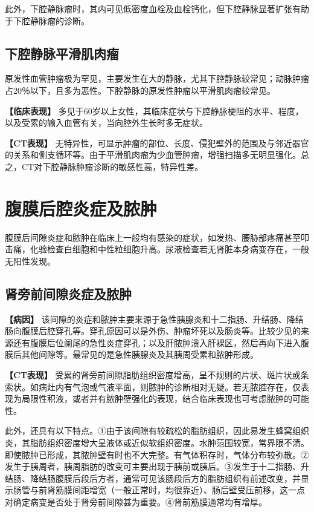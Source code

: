此外，下腔静脉瘤时，其内可见低密度血栓及血栓钙化，但下腔静脉显著扩张有助于下腔静脉瘤的诊断。

\subsection{下腔静脉平滑肌肉瘤}

原发性血管肿瘤极为罕见，主要发生在大的静脉，尤其下腔静脉较常见；动脉肿瘤占20％以下，且多为恶性。下腔静脉的原发性肿瘤以平滑肌肉瘤较常见。

\textbf{【临床表现】}
多见于60岁以上女性，其临床症状与下腔静脉梗阻的水平、程度，以及受累的输入血管有关，当向腔外生长时多无症状。

\textbf{【CT表现】}
无特异性，可显示肿瘤的部位、长度、侵犯壁外的范围及与邻近器官的关系和侧支循环等。由于平滑肌肉瘤为少血管肿瘤，增强扫描多无明显强化。总之，CT对下腔静脉肿瘤诊断的敏感性高，特异性差。

\section{腹膜后腔炎症及脓肿}

腹膜后间隙炎症和脓肿在临床上一般均有感染的症状，如发热、腰胁部疼痛甚至叩击痛，化验检查白细胞和中性粒细胞升高。尿液检查若无肾脏本身病变存在，一般无阳性发现。

\subsection{肾旁前间隙炎症及脓肿}

\textbf{【病因】}
该间隙的炎症和脓肿主要来源于急性胰腺炎和十二指肠、升结肠、降结肠向腹膜后腔穿孔等。穿孔原因可以是外伤、肿瘤坏死以及肠炎等。比较少见的来源还有腹膜后位阑尾的急性炎症穿孔；以及肝脓肿溃入肝裸区，然后再向下进入腹膜后其他间隙等。最常见的是急性胰腺炎及其胰周受累和脓肿形成。

\textbf{【CT表现】}
受累的肾旁前间隙脂肪组织密度增高，呈不规则的片状、斑片状或条索状。如病灶内有气泡或气液平面，则脓肿的诊断相对无疑。若无脓腔存在，仅表现为局限性积液，或者并有脓肿壁强化的表现，结合临床表现也可考虑脓肿的可能性。

此外，还具有以下特点。①由于该间隙有较疏松的脂肪组织，因此易发生蜂窝组织炎，其脂肪组织密度增大呈液体或近似软组织密度。水肿范围较宽，常界限不清。即使脓肿已形成，其脓肿壁有时也不大完整。有气体积存时，气体分布较弥散。②发生于胰周者，胰周脂肪的改变可主要出现于胰前或胰后。③发生于十二指肠、升结肠、降结肠腹膜后段后方者，通常可见该肠段后方的脂肪组织有前述改变，并显示肠管与前肾筋膜间距增宽（一般正常时，均很靠近）、肠后壁受压前移，这一点对确定病变是否处于肾旁前间隙甚为重要。④肾前筋膜通常均有增厚。

